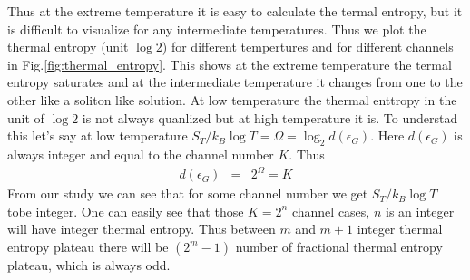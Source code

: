 \documentclass[reprint,prb,superscriptaddress]{revtex4-1}
\begin{document}
Thus at the extreme temperature it is easy to calculate the termal entropy, but it is difficult to visualize for any intermediate temperatures. Thus we plot the thermal entropy (unit $\log 2$) for different tempertures and for different channels in Fig.\ref{fig:thermal_entropy}. This shows at the extreme temperature the termal entropy saturates and at the intermediate temperature it changes from one to the other like a soliton like solution. At low temperature the thermal enttropy in the unit of $\log 2$ is not always quanlized but at high temperature it is. To understad this let's say at low temperature $S_T/k_B\log T=\Omega=\log_2 d(\epsilon_{G})$. Here $d(\epsilon_{G})$ is always integer and equal to the channel number $K$. Thus 
\begin{eqnarray}
d(\epsilon_{G}) &=& 2^{\Omega}=K
\end{eqnarray}
From our study we can see that for some channel number we get $S_T/k_B\log T$ tobe integer. One can easily see that those $K=2^n$ channel cases, $n$ is an integer will have integer thermal entropy. Thus between $m$ and $m+1$ integer thermal entropy plateau there will be $(2^m-1)$ number of fractional thermal entropy plateau, which is always odd.
\end{document}
